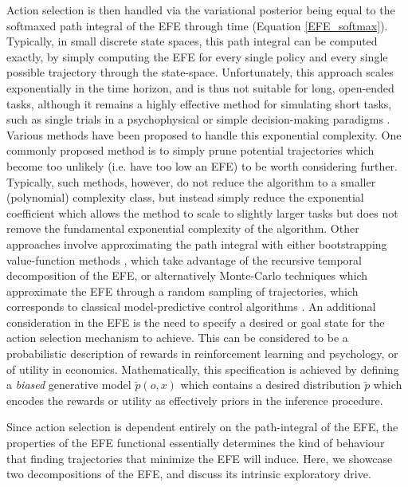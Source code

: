 Action selection is then handled via the variational posterior being equal to the softmaxed path integral of the EFE through time (Equation \ref{EFE_softmax}). Typically, in small discrete state spaces, this path integral can be computed exactly, by simply computing the EFE for every single policy and every single possible trajectory through the state-space. Unfortunately, this approach scales exponentially in the time horizon, and is thus not suitable for long, open-ended tasks, although it remains a highly effective method for simulating short tasks, such as single trials in a psychophysical or simple decision-making paradigms \citep{friston_active_2015,schwartenbeck2015optimal,friston2020sophisticated}. Various methods have been proposed to handle this exponential complexity. One commonly proposed method is to simply prune potential trajectories which become too unlikely (i.e. have too low an EFE) to be worth considering further. Typically, such methods, however, do not reduce the algorithm to a smaller (polynomial) complexity class, but instead simply reduce the exponential coefficient which allows the method to scale to slightly larger tasks but does not remove the fundamental exponential complexity of the algorithm. Other approaches involve approximating the path integral with either bootstrapping value-function methods \citep{millidge_deep_2019}, which take advantage of the recursive temporal decomposition of the EFE, or alternatively Monte-Carlo techniques which approximate the EFE through a random sampling of trajectories, which corresponds to classical model-predictive control algorithms \citep{kappen2012optimal}. An additional consideration in the EFE is the need to specify a desired or goal state for the action selection mechanism to achieve. This can be considered to be a probabilistic description of rewards in reinforcement learning and psychology, or of utility in economics. Mathematically, this specification is achieved by defining a \emph{biased} generative model $\tilde{p}(o,x)$ which contains a desired distribution $\tilde{p}$ which encodes the rewards or utility as effectively priors in the inference procedure.

Since action selection is dependent entirely on the path-integral of the EFE, the properties of the EFE functional essentially determines the kind of behaviour that finding trajectories that minimize the EFE will induce. Here, we showcase two decompositions of the EFE, and discuss its intrinsic exploratory drive.

